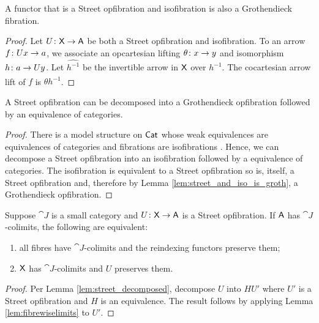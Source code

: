 \documentclass{amsart}
\begin{document}
\begin{lem} \label{lem:street_and_iso_is_groth}
  A functor that is a Street opfibration and isofibration is also a Grothendieck fibration. 
\end{lem}

\begin{proof}
  Let $U \colon\mathsf{X} \to \mathsf{A}$ be both a Street opfibration and isofibration. To an arrow $f \colon Ux \to a$, we associate an opcartesian lifting $\theta \colon x \to y$ and isomorphism $h \colon a \to Uy$. Let $\hat{h^{-1}}$ be the invertible arrow in $\mathsf{X}$ over $h^{-1}$. The cocartesian arrow lift of $f$ is $\theta \hat{h^{-1}}$.  
\end{proof}

\begin{lem} \label{lem:street_decomposed}
  A Street opfibration can be decomposed into a Grothendieck opfibration followed by an equivalence of categories.
\end{lem}

\begin{proof}
  There is a model structure on $\mathsf{Cat}$ whose weak equivalences are equivalences of categories and fibrations are isofibrations \cite{rezk}. Hence, we can decompose a Street opfibration into an isofibration followed by a equivalence of categories. The isofibration is equivalent to a Street opfibration so is, itself, a Street opfibration and, therefore by Lemma \ref{lem:street_and_iso_is_groth}, a Grothendieck opfibration.  
\end{proof}

\begin{lem} \label{lem:street-fibrewise-limits}
  Suppose $ \cat{J} $ is a small category and $ U \colon \mathsf{X}
  \to \mathsf{A} $ is a Street opfibration. If $ \mathsf{A} $ has $ \cat{J}
  $-colimits, the following are equivalent:
  \begin{enumerate}
  \item
    all fibres have $ \cat{J} $-colimits and the
    reindexing functors preserve them;
  \item
    $ \mathsf{X} $ has $ \cat{J} $-colimits and $ U $ preserves
    them.
  \end{enumerate}
\end{lem}

\begin{proof}
  Per Lemma \ref{lem:street_decomposed}, decompose $U$ into $H U'$ where $U'$ is a Street opfibration and $H$ is an equivalence. The result follows by applying Lemma \ref{lem:fibrewiselimits} to $U'$.  
\end{proof}
\end{document}
